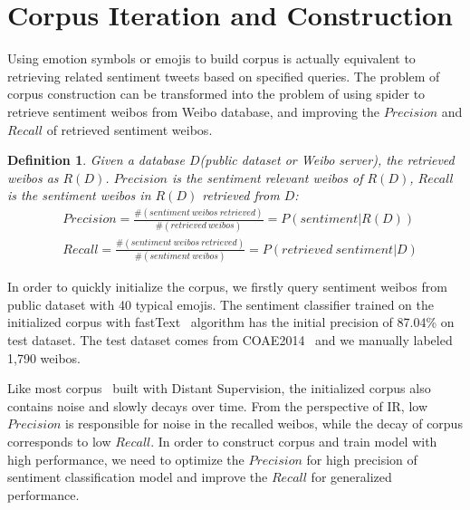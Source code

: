 \documentclass[runningheads]{llncs}
\begin{document}
\section{Corpus Iteration and Construction}
Using emotion symbols or emojis to build corpus is actually equivalent to retrieving related sentiment tweets based on specified queries. The problem of corpus construction can be transformed into the problem of using spider to retrieve sentiment weibos from Weibo database, and improving the $Precision$ and $Recall$ of retrieved sentiment weibos. 

\newtheorem{myDef}{Definition}

\begin{myDef}
Given a database $D$(public dataset or Weibo server), the retrieved weibos as $R(D)$.  $Precision$ is the sentiment relevant weibos of $R(D)$, $Recall$ is the sentiment weibos in $R(D)$ retrieved from $D$:
\scriptsize{ %
\begin{align}
&Precision = \frac{\#\left ( sentiment\ weibos\ retrieved \right )}{\#\left ( retrieved\ weibos \right )} = P\left ( sentiment | R(D) \right ) \\
&Recall = \frac{\#\left ( sentiment\ weibos\ retrieved \right )}{\#\left ( sentiment\ weibos \right )} = P\left (retrieved\ sentiment | D\right )
\end{align}
} %
\end{myDef}

In order to quickly initialize the corpus, we firstly query sentiment weibos from public dataset with 40 typical emojis. The sentiment classifier trained on the initialized corpus with fastText~\cite{joulin2016bag} algorithm has the initial precision of 87.04\% on test dataset. The test dataset comes from COAE2014~\cite{Yang2015Task} and we manually labeled 1,790 weibos.

Like most corpus~\cite{go2009twitter,pak2010twitter,iosifidis2017large} built with Distant Supervision, the initialized corpus also contains noise and slowly decays over time. From the perspective of IR, low $Precision$ is responsible for noise in the recalled weibos, while the decay of corpus corresponds to low $Recall$. In order to construct corpus and train model with high performance, we need to optimize the $Precision$ for high precision of sentiment classification model and improve the $Recall$ for generalized performance.
\end{document}
